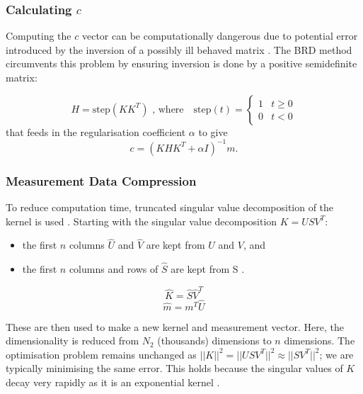 \subsubsection{Calculating $c$}
    Computing the $c$ vector can be computationally dangerous due to potential error introduced by the inversion of a possibly ill behaved matrix \cite{BulterReedsDawsonMethod1981}. The BRD method circumvents this problem by ensuring inversion is done by a positive semidefinite matrix: 
 
\begin{equation}
    H = \text{step}(KK^T) \text{  , where} \quad \text{step}(t) = 
    \begin{cases}
    1  & t \geq 0\\
    0  & t < 0
    \end{cases}
    \label{eq:makeSemiPostiveDefinite}
\end{equation}   
that feeds in the regularisation coefficient \cite{BulterReedsDawsonMethod1981} $\alpha$ to give
\begin{equation}
    c =  (KHK^T + \alpha I)^{-1} m \text{.} 
    \label{eq:optFindC}
\end{equation} 


\subsubsection{Measurement Data Compression} \label{section:compression}
To reduce computation time, truncated singular value decomposition of the kernel is used \cite{Venk2DFredholm2002}. Starting with the singular value decomposition $K = U S V^T$:
\begin{itemize}
    \item the first $n$ columns $\hat{U}$ and $\hat{V}$ are kept from $U$ and $V$, and
    \item the first $n$ columns and rows of $\hat{S}$ are kept from S \cite{TSVDHansen1987truncatedsvd}.
\end{itemize}

\begin{equation}
    \hat{K} = \hat{S} \hat{V}^T
    \label{eq:compressedKernel}
\end{equation}
\begin{equation}
    \hat{m} = m^T \hat{U}
    \label{eq:compressedMeasurement}    
\end{equation}

These are then used to make a new kernel and measurement vector. Here, the dimensionality is reduced from $N_2$ (thousands) dimensions to $n$ dimensions. The optimisation problem remains unchanged as $||K||^2 = ||USV^T||^2 \approx ||SV^T||^2$; we are typically minimising the same error. This holds because the singular values of $K$ decay very rapidly as it is an exponential kernel \cite{NumericalInversionLaplaceTransform1978}.



